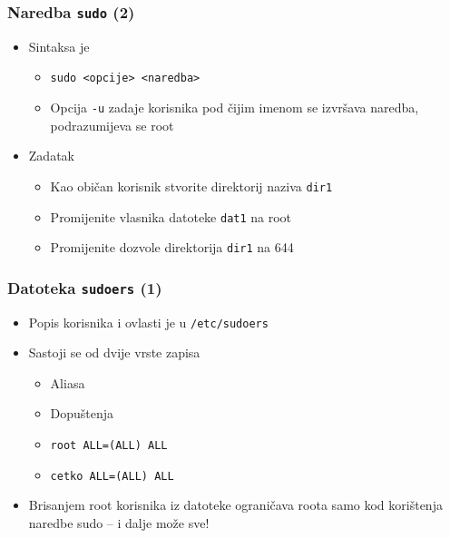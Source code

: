 \documentclass[table,usenames,dvipsnames]{beamer}
\newcommand{\shell}[1]{\texttt{#1}}
\begin{document}
\begin{frame}[t]
\frametitle{Naredba \shell{sudo} (2)}
\begin{itemize}
  \item Sintaksa je
  \begin{itemize}
    \item[] \shell{sudo <opcije> <naredba>}
    \item Opcija \shell{-u} zadaje korisnika pod čijim imenom se izvršava 
          naredba, podrazumijeva se root
  \end{itemize}
  \item Zadatak
  \begin{itemize}
    \item Kao običan korisnik stvorite direktorij naziva \shell{dir1}
    \item Promijenite vlasnika datoteke \shell{dat1} na root
    \item Promijenite dozvole direktorija \shell{dir1} na 644 
  \end{itemize}
\end{itemize}
\end{frame}

\begin{frame}[t]
\frametitle{Datoteka \shell{sudoers} (1)}
\begin{itemize}
  \item Popis korisnika i ovlasti je u \shell{/etc/sudoers}
  \item Sastoji se od dvije vrste zapisa
  \begin{itemize}
    \item Aliasa
    \item Dopuštenja
    \item[] \shell{root\hspace{5pt}    ALL=(ALL) ALL}
    \item[] \shell{cetko   ALL=(ALL) ALL}
  \end{itemize}
  \item Brisanjem root korisnika iz datoteke ograničava roota samo kod 
        korištenja naredbe sudo -- i dalje može sve!
\end{itemize}
\end{frame}
\end{document}
